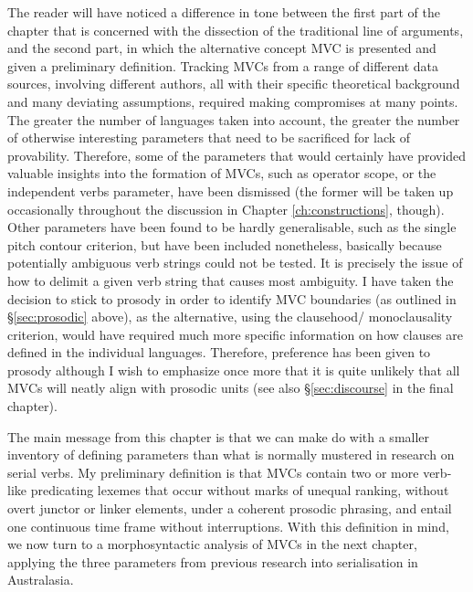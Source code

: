 The reader will have noticed a difference in tone between the first part of the chapter that is concerned with the dissection of the traditional line of arguments, and the second part, in which the alternative concept MVC is presented and given a preliminary definition. Tracking MVCs from a range of different data sources, involving different authors, all with their specific theoretical background and many deviating assumptions, required making compromises at many points. The greater the number of languages taken into account, the greater the number of otherwise interesting parameters that need to be sacrificed for lack of provability. Therefore, some of the parameters that would certainly have provided valuable insights into the formation of MVCs, such as operator scope, or the independent verbs parameter, have been dismissed (the former will be taken up occasionally throughout the discussion in Chapter \ref{ch:constructions}, though). Other parameters have been found to be hardly generalisable, such as the single pitch contour criterion, but have been included nonetheless, basically because potentially ambiguous verb strings could not be tested. It is precisely the issue of how to delimit a given verb string that causes most ambiguity. I have taken the decision to stick to prosody in order to identify MVC boundaries (as outlined in §\ref{sec:prosodic} above), as the alternative, using the clausehood/ monoclausality criterion, would have required much more specific information on how clauses are defined in the individual languages. Therefore, preference has been given to prosody although I wish to emphasize once more that it is quite unlikely that all MVCs will neatly align with prosodic units (see also §\ref{sec:discourse} in the final chapter).

The main message from this chapter is that we can make do with a smaller inventory of defining parameters than what is normally mustered in research on serial verbs. My preliminary definition is that MVCs contain two or more verb-like predicating lexemes that occur without marks of unequal ranking, without overt junctor or linker elements, under a coherent prosodic phrasing, and entail one continuous time frame without interruptions. With this definition in mind, we now turn to a morphosyntactic analysis of MVCs in the next chapter, applying the three parameters from previous research into serialisation in Australasia. 